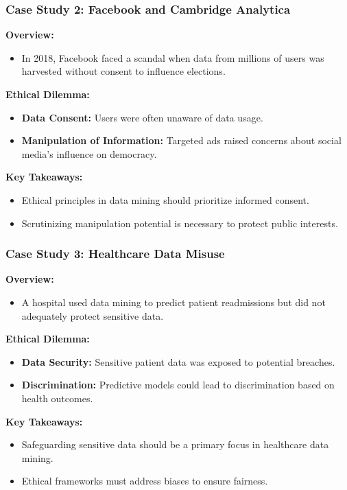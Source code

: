 \documentclass{beamer}
\begin{document}
\begin{frame}[fragile]
    \frametitle{Case Study 2: Facebook and Cambridge Analytica}
    \textbf{Overview:}
    \begin{itemize}
        \item In 2018, Facebook faced a scandal when data from millions of users was harvested without consent to influence elections.
    \end{itemize}
    
    \textbf{Ethical Dilemma:}
    \begin{itemize}
        \item \textbf{Data Consent:} Users were often unaware of data usage.
        \item \textbf{Manipulation of Information:} Targeted ads raised concerns about social media's influence on democracy.
    \end{itemize}
    
    \textbf{Key Takeaways:}
    \begin{itemize}
        \item Ethical principles in data mining should prioritize informed consent.
        \item Scrutinizing manipulation potential is necessary to protect public interests.
    \end{itemize}
\end{frame}

\begin{frame}[fragile]
    \frametitle{Case Study 3: Healthcare Data Misuse}
    \textbf{Overview:}
    \begin{itemize}
        \item A hospital used data mining to predict patient readmissions but did not adequately protect sensitive data.
    \end{itemize}
    
    \textbf{Ethical Dilemma:}
    \begin{itemize}
        \item \textbf{Data Security:} Sensitive patient data was exposed to potential breaches.
        \item \textbf{Discrimination:} Predictive models could lead to discrimination based on health outcomes.
    \end{itemize}
    
    \textbf{Key Takeaways:}
    \begin{itemize}
        \item Safeguarding sensitive data should be a primary focus in healthcare data mining.
        \item Ethical frameworks must address biases to ensure fairness.
    \end{itemize}
\end{frame}
\end{document}
